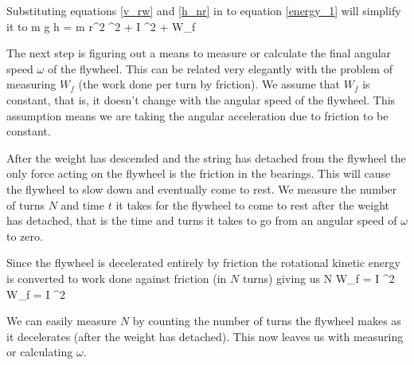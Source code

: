     Substituting equations \eqref{v_rw} and \eqref{h_nr} in to equation \eqref{energy_1} will simplify it to
    \beq \label{energy_2}
        m g h =  m r^2 \omega^2 +  I \omega^2 +  W_f
    \eeq

    The next step is figuring out a means to measure or calculate the final angular speed $\omega$ of the flywheel. This can be related very elegantly with the problem of measuring $W_f$ (the work done per turn by friction). We assume that $W_f$ is constant, that is, it doesn't change with the angular speed of the flywheel. This assumption means we are taking the angular acceleration due to friction to be constant.

    After the weight has descended and the string has detached from the flywheel the only force acting on the flywheel is the friction in the bearings. This will cause the flywheel to slow down and eventually come to rest. We measure the number of turns $N$ and time $t$ it takes for the flywheel to come to rest after the weight has detached, that is the time and turns it takes to go from an angular speed of $\omega$ to zero.

    Since the flywheel is decelerated entirely by friction the rotational kinetic energy is converted to work done against friction (in $N$ turns) giving us
    \beq \label{W_f}
        N W_f =  I \omega^2 \imply W_f =  I \omega^2
    \eeq

    We can easily measure $N$ by counting the number of turns the flywheel makes as it decelerates (after the weight has detached). This now leaves us with measuring or calculating $\omega$.
